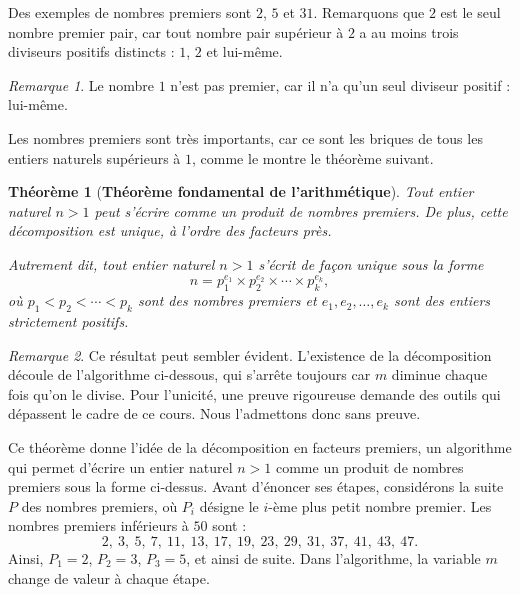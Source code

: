 \documentclass[12pt,a4paper]{article}
\theoremstyle{plain}
\newtheorem{theorem}{Théorème}[section]
\theoremstyle{definition}
\theoremstyle{remark}
\newtheorem*{remark}{Remarque}
\begin{document}
Des exemples de nombres premiers sont $2$, $5$ et $31$. Remarquons que
$2$ est le seul nombre premier pair, car tout nombre pair supérieur à
$2$ a au moins trois diviseurs positifs distincts : $1$, $2$ et
lui-même.

\begin{remark}
  Le nombre $1$ n'est pas premier, car il n'a qu'un seul diviseur
  positif : lui-même.
\end{remark}

Les nombres premiers sont très importants, car ce sont les briques de
tous les entiers naturels supérieurs à $1$, comme le montre le
théorème suivant.

\begin{tcolorbox}[navybar]
\begin{theorem}[\textbf{Théorème fondamental de l'arithmétique}]
  Tout entier naturel $n > 1$ peut s'écrire comme un produit de
  nombres premiers. De plus, cette décomposition est unique, à l'ordre
  des facteurs près.

  Autrement dit, tout entier naturel $n > 1$ s'écrit de façon unique
  sous la forme
  \[
    n = p_1^{e_1} \times p_2^{e_2} \times \cdots \times p_k^{e_k},
  \]
  où $p_1 < p_2 < \cdots < p_k$ sont des nombres premiers et
  $e_1, e_2, \dots, e_k$ sont des entiers strictement positifs.
\end{theorem}
\end{tcolorbox}

\begin{remark}
  Ce résultat peut sembler évident. L'existence de la décomposition
  découle de l'algorithme ci-dessous, qui s'arrête toujours car $m$
  diminue chaque fois qu'on le divise. Pour l'unicité, une preuve
  rigoureuse demande des outils qui dépassent le cadre de ce cours.
  Nous l'admettons donc sans preuve.
\end{remark}

Ce théorème donne l'idée de la décomposition en facteurs premiers, un
algorithme qui permet d'écrire un entier naturel $n > 1$ comme un
produit de nombres premiers sous la forme ci-dessus. Avant d'énoncer
ses étapes, considérons la suite $P$ des nombres premiers, où $P_i$
désigne le $i$-ème plus petit nombre premier. Les nombres premiers
inférieurs à $50$ sont :
\[
  2,\ 3,\ 5,\ 7,\ 11,\ 13,\ 17,\ 19,\ 23,\ 29,\ 31,\ 37,\ 41,\ 43,\ 47.
\]
Ainsi, $P_1 = 2$, $P_2 = 3$, $P_3 = 5$, et ainsi de suite. Dans
l'algorithme, la variable $m$ change de valeur à chaque étape.
\end{document}

